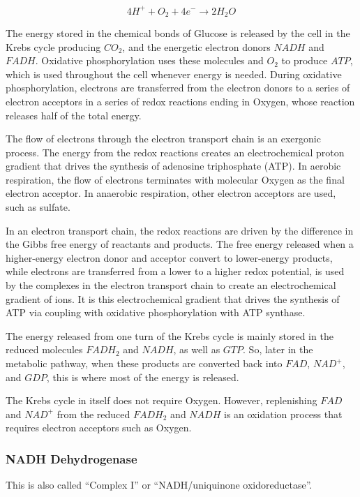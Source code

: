 \documentclass[a4paper,14pt]{extarticle}
\begin{document}
\[
    4H^+ + O_2 + 4e^- \rightarrow 2H_2O
\]

The energy stored in the chemical bonds of Glucose is released by the cell in the Krebs
cycle producing $CO_2$, and the energetic electron donors $\mathit{NADH}$ and
$\mathit{FADH}$.  Oxidative phosphorylation uses these molecules and $O_2$ to produce
$\mathit{ATP}$, which is used throughout the cell whenever energy is needed. During
oxidative phosphorylation, electrons are transferred from the electron donors to a series
of electron acceptors in a series of redox reactions ending in Oxygen, whose reaction
releases half of the total energy.

The flow of electrons through the electron transport chain is an exergonic process. The
energy from the redox reactions creates an electrochemical proton gradient that drives the
synthesis of adenosine triphosphate (ATP). In aerobic respiration, the flow of electrons
terminates with molecular Oxygen as the final electron acceptor. In anaerobic respiration,
other electron acceptors are used, such as sulfate.

In an electron transport chain, the redox reactions are driven by the difference in the
Gibbs free energy of reactants and products. The free energy released when a higher-energy
electron donor and acceptor convert to lower-energy products, while electrons are
transferred from a lower to a higher redox potential, is used by the complexes in the
electron transport chain to create an electrochemical gradient of ions. It is this
electrochemical gradient that drives the synthesis of ATP via coupling with oxidative
phosphorylation with ATP synthase.

The energy released from one turn of the Krebs cycle is mainly stored in the reduced
molecules $\mathit{FADH_2}$ and $\mathit{NADH}$, as well as $\mathit{GTP}$. So, later in
the metabolic pathway, when these products are converted back into $\mathit{FAD}$,
$\mathit{NAD^+}$, and $\mathit{GDP}$, this is where most of the energy is released.

The Krebs cycle in itself does not require Oxygen. However, replenishing $\mathit{FAD}$
and $\mathit{NAD^+}$ from the reduced $\mathit{FADH_2}$ and $\mathit{NADH}$ is an
oxidation process that requires electron acceptors such as Oxygen.

\subsubsection{NADH Dehydrogenase}
This is also called ``Complex I'' or ``NADH/uniquinone oxidoreductase''.
\end{document}
